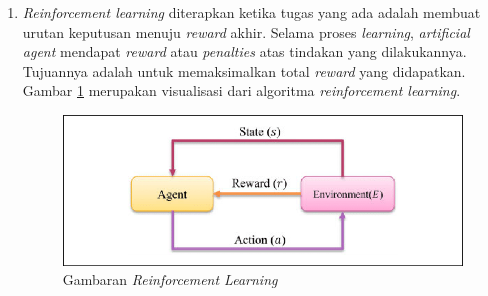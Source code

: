 \begin{enumerate}
	
	\item \textit{Reinforcement learning} diterapkan ketika tugas yang ada
	adalah membuat urutan keputusan menuju \textit{reward} akhir. Selama proses \textit{learning}, \textit{artificial agent} mendapat \textit{reward} atau \textit{penalties} atas tindakan yang dilakukannya. Tujuannya adalah untuk memaksimalkan total \textit{reward} yang didapatkan. Gambar \ref{fig:reinforcement} merupakan visualisasi dari algoritma \textit{reinforcement learning}.
	
	\begin{figure}[ht]
		\centering
		\includegraphics[scale=0.3]{gambar/reinforcement.png}
		\caption{Gambaran \textit{Reinforcement Learning}\citep{reinforcement}}
		\label{fig:reinforcement}
	\end{figure}
\end{enumerate}
